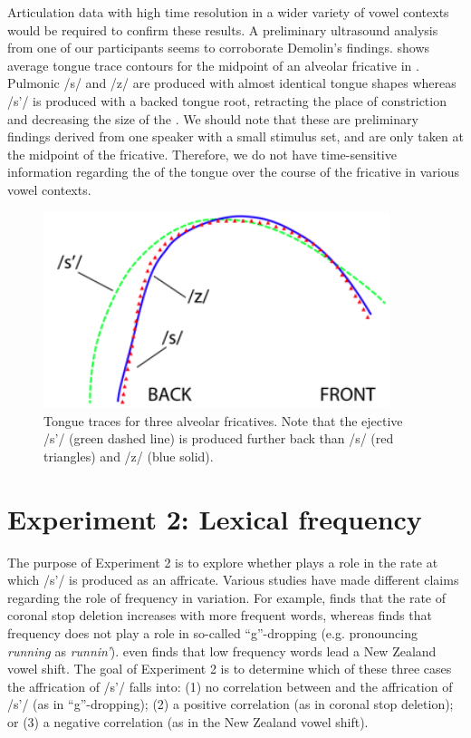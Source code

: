 \documentclass[output=paper
,newtxmath
,modfonts
,nonflat]{langsci/langscibook}
\begin{document}
Articulation data with high time resolution in a wider variety of vowel contexts would be required to confirm these results. A preliminary ultrasound analysis from one of our participants seems to corroborate Demolin’s findings.  shows average tongue trace contours for the midpoint of an alveolar fricative in . Pulmonic /s/ and /z/ are produced with almost identical tongue shapes whereas /s’/ is produced with a backed tongue root, retracting the place of constriction and decreasing the size of the . We should note that these are preliminary findings derived from one speaker with a small stimulus set, and are only taken at the midpoint of the fricative. Therefore, we do not have time-sensitive information regarding the  of the tongue over the course of the fricative in various vowel contexts.

   

\begin{figure}
\includegraphics[width=0.9\textwidth]{figures/fig-moeng-3}
\caption{Tongue traces for three alveolar fricatives. Note that the ejective /s’/ (green dashed line) is produced further back than /s/ (red triangles) and /z/ (blue solid).}
\label{fig:moeng:4}
\end{figure}

\section{Experiment 2: Lexical frequency}\label{sec:moeng:6}

The purpose of Experiment 2 is to explore whether  plays a role in the rate at which /s’/ is produced as an affricate. Various studies have made different claims regarding the role of frequency in variation. For example, \citet{bybee2002word} finds that the rate of  coronal stop deletion increases with more frequent words, whereas \citet{labov2011principles} finds that frequency does not play a role in so-called “g”-dropping (e.g. pronouncing \textit{running} as \textit{runnin’}). \citet{hay2015tracking} even finds that low frequency words lead a New Zealand vowel shift. The goal of Experiment 2 is to determine which of these three cases the affrication of /s’/ falls into: (1) no correlation between  and the affrication of /s’/ (as in “g”-dropping); (2) a positive correlation (as in coronal stop deletion); or (3) a negative correlation (as in the New Zealand vowel shift).
\end{document}
